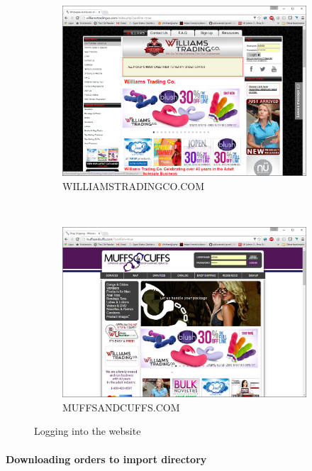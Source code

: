 \begin{figure}[H]
	\centering
	\begin{subfigure}[b]{0.4\textwidth}
		\includegraphics[width=\textwidth]{../img/image48}
		\caption{{\tiny WILLIAMSTRADINGCO.COM}}
	\end{subfigure}
	~
	\begin{subfigure}[b]{0.4\textwidth}
		\includegraphics[width=\textwidth]{../img/image47}
		\caption{{\tiny MUFFSANDCUFFS.COM}}
	\end{subfigure}
	\caption{Logging into the website}
\end{figure}

\paragraph{Downloading orders to import directory}

